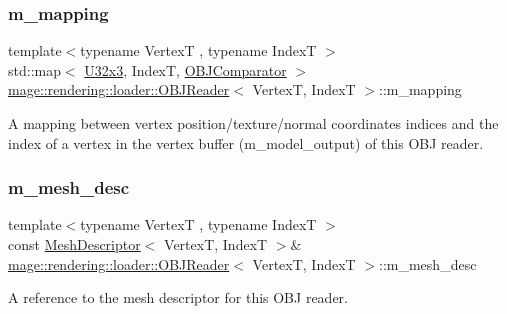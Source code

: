 \subsubsection{\texorpdfstring{m\+\_\+mapping}{m\_mapping}}
{\footnotesize\ttfamily template$<$typename VertexT , typename IndexT $>$ \\
std\+::map$<$ \hyperlink{namespacemage_ab3633c193f686845fcf80ce95d18a20b}{U32x3}, IndexT, \hyperlink{structmage_1_1rendering_1_1loader_1_1_o_b_j_reader_1_1_o_b_j_comparator}{O\+B\+J\+Comparator} $>$ \hyperlink{classmage_1_1rendering_1_1loader_1_1_o_b_j_reader}{mage\+::rendering\+::loader\+::\+O\+B\+J\+Reader}$<$ VertexT, IndexT $>$\+::m\+\_\+mapping\hspace{0.3cm}{\ttfamily [private]}}

A mapping between vertex position/texture/normal coordinates\textquotesingle{} indices and the index of a vertex in the vertex buffer ({\ttfamily m\+\_\+model\+\_\+output}) of this O\+BJ reader. \hypertarget{classmage_1_1rendering_1_1loader_1_1_o_b_j_reader_aa029c035456ea9456d63726b15e5db05}{}\label{classmage_1_1rendering_1_1loader_1_1_o_b_j_reader_aa029c035456ea9456d63726b15e5db05} 
\subsubsection{\texorpdfstring{m\+\_\+mesh\+\_\+desc}{m\_mesh\_desc}}
{\footnotesize\ttfamily template$<$typename VertexT , typename IndexT $>$ \\
const \hyperlink{classmage_1_1rendering_1_1_mesh_descriptor}{Mesh\+Descriptor}$<$ VertexT, IndexT $>$\& \hyperlink{classmage_1_1rendering_1_1loader_1_1_o_b_j_reader}{mage\+::rendering\+::loader\+::\+O\+B\+J\+Reader}$<$ VertexT, IndexT $>$\+::m\+\_\+mesh\+\_\+desc\hspace{0.3cm}{\ttfamily [private]}}

A reference to the mesh descriptor for this O\+BJ reader. \hypertarget{classmage_1_1rendering_1_1loader_1_1_o_b_j_reader_a645fca7c3f7f9860cb879f4088c4f8fc}{}\label{classmage_1_1rendering_1_1loader_1_1_o_b_j_reader_a645fca7c3f7f9860cb879f4088c4f8fc} 
